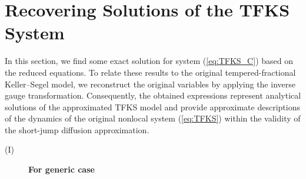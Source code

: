 \documentclass{article}
\begin{document}
\section{Recovering Solutions of the TFKS System}\label{sec:ExactSolutions}
\par 
In this section, we find some exact solution for system (\ref{eq:TFKS_C}) based on the reduced equations. To relate these results to the original tempered-fractional Keller--Segel model, we reconstruct the original variables by applying the inverse gauge transformation. Consequently, the obtained expressions represent analytical solutions of the approximated TFKS model and provide approximate descriptions of the dynamics of the original nonlocal system (\ref{eq:TFKS}) within the validity of the short-jump diffusion approximation.
  
\begin{description}
\item[(I)] \textbf{For generic case}\\

\end{description}
\end{document}
